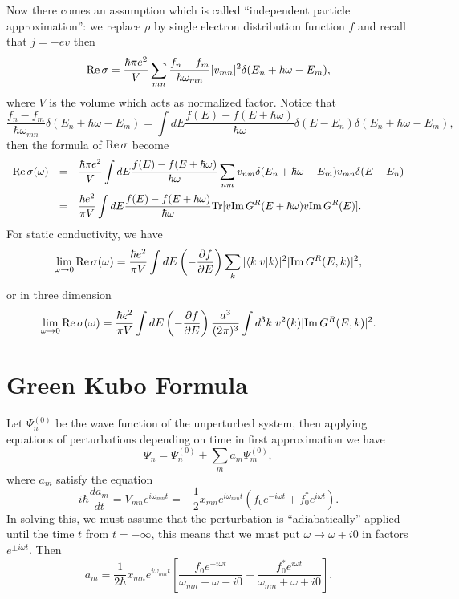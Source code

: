 \documentclass{book}
\newcommand{\bra}[1]{{\langle#1|}}
\newcommand{\ket}[1]{{|#1\rangle}}
\renewcommand{\Re}{{\rm Re}}
\renewcommand{\Im}{{\rm Im}}
\newcommand{\Tr}{{\rm Tr}}
\numberwithin{equation}{section}
\begin{document}
Now there comes an assumption which is called ``independent particle
approximation'': we replace $\rho$ by single electron distribution
function $f$ and recall that $j=-ev$ then
\begin{equation}
  \Re\,\sigma=\frac{\hbar\pi e^2}{V}\sum_{mn}
  \frac{f_n-f_m}{\hbar\omega_{mn}}|v_{mn}|^2\delta(E_n+\hbar\omega-E_m),
\end{equation}
where $V$ is the volume which acts as normalized factor.
Notice that 
\begin{equation}
  \frac{f_n-f_m}{\hbar\omega_{mn}}\delta(E_n+\hbar\omega-E_m)=
  \int dE\frac{f(E)-f(E+\hbar\omega)}{\hbar\omega}
  \delta(E-E_n)\delta(E_n+\hbar\omega-E_m),
\end{equation}
then the formula of $\Re\,\sigma$ become
\begin{equation}
  \begin{array}{rcl}
    \Re\,\sigma(\omega)&=&\displaystyle\frac{\hbar\pi e^2}{V} \int
    dE\frac{f(E)-f(E+\hbar\omega)}{\hbar\omega}\sum_{nm}
    v_{nm}\delta(E_n+\hbar\omega-E_m)v_{mn}\delta(E-E_n)\\\vbox to
    20pt{} &=&\displaystyle\frac{\hbar e^2}{\pi V}\int dE
    \frac{f(E)-f(E+\hbar\omega)}{\hbar\omega}
    \Tr[v\Im\,G^R(E+\hbar\omega)v\Im\,G^R(E)].
  \end{array}
\end{equation}
For static conductivity, we have
\begin{equation}
  \lim_{\omega\to0}\Re\,\sigma(\omega)=
  \frac{\hbar e^2}{\pi V}\int dE
  \left(-\frac{\partial f}{\partial E}\right)
  \sum_k|\bra{k}v\ket{k}|^2|\Im\,G^R(E,k)|^2,
\end{equation}
or in three dimension
\begin{equation}
  \lim_{\omega\to0}\Re\,\sigma(\omega)=
  \frac{\hbar e^2}{\pi V}\int dE
  \left(-\frac{\partial f}{\partial E}\right)
  \frac{a^3}{(2\pi)^3}\int d^3k\; v^2(k)|\Im\,G^R(E,k)|^2.
\end{equation}

\section{Green Kubo Formula}
Let $\Psi^{(0)}_n$ be the wave function of the unperturbed system,
then applying equations of perturbations depending on time in first
approximation we have
\begin{equation}
  \Psi_n=\Psi^{(0)}_n+\sum_ma_{m}\Psi^{(0)}_m,
\end{equation}
where $a_m$ satisfy the equation
\begin{equation}
  i\hbar\frac{da_m}{dt}=V_{mn}e^{i\omega_{mn}t}=-\frac{1}{2}
  x_{mn}e^{i\omega_{mn}t}(f_0e^{-i\omega t}+f_0^*e^{i\omega t}).
\end{equation}
In solving this, we must assume that the perturbation is ``adiabatically''
applied until the time $t$ from $t=-\infty$, this means that we must put
$\omega\to\omega\mp i0$ in factors $e^{\pm i\omega t}$. Then
\begin{equation}
  a_m=\frac{1}{2\hbar}x_{mn}e^{i\omega_{mn}t}\left[
    \frac{f_0e^{-i\omega t}}{\omega_{mn}-\omega-i0}+
    \frac{f_0^*e^{i\omega t}}{\omega_{mn}+\omega+i0}\right].
\end{equation}
\end{document}
